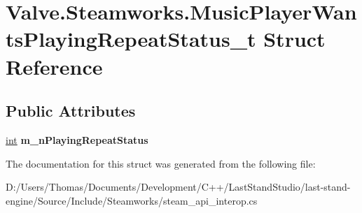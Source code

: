 \hypertarget{structValve_1_1Steamworks_1_1MusicPlayerWantsPlayingRepeatStatus__t}{}\section{Valve.\+Steamworks.\+Music\+Player\+Wants\+Playing\+Repeat\+Status\+\_\+t Struct Reference}
\label{structValve_1_1Steamworks_1_1MusicPlayerWantsPlayingRepeatStatus__t}
\subsection*{Public Attributes}
\begin{DoxyCompactItemize}
\item 
\hypertarget{structValve_1_1Steamworks_1_1MusicPlayerWantsPlayingRepeatStatus__t_a055c3d574302c3234294c657cfcc382a}{}\hyperlink{SDL__thread_8h_a6a64f9be4433e4de6e2f2f548cf3c08e}{int} {\bfseries m\+\_\+n\+Playing\+Repeat\+Status}\label{structValve_1_1Steamworks_1_1MusicPlayerWantsPlayingRepeatStatus__t_a055c3d574302c3234294c657cfcc382a}

\end{DoxyCompactItemize}


The documentation for this struct was generated from the following file\+:\begin{DoxyCompactItemize}
\item 
D\+:/\+Users/\+Thomas/\+Documents/\+Development/\+C++/\+Last\+Stand\+Studio/last-\/stand-\/engine/\+Source/\+Include/\+Steamworks/steam\+\_\+api\+\_\+interop.\+cs\end{DoxyCompactItemize}
